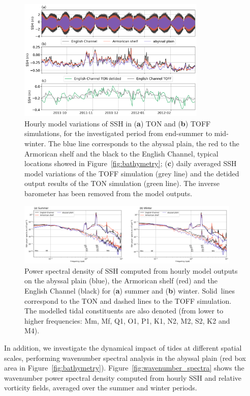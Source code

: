 \documentclass[jmse,article,accept,moreauthors,pdftex]{Definitions/mdpi}
\begin{document}
\begin{figure}[H]
    \centering
    \includegraphics[width=0.8\textwidth]{Definitions/figure10.png}
    \caption{Hourly model variations of SSH in (\textbf{a}) TON and (\textbf{b}) TOFF simulations, for the investigated period from end-summer to mid-winter. The blue line corresponds to the abyssal plain, the red to the Armorican shelf and the black to the English Channel, typical locations showed in Figure~\ref{fig:bathymetry}; (\textbf{c}) daily averaged SSH model variations of the TOFF simulation (grey line) and the detided output results of the TON simulation (green line). The inverse barometer has been removed from the model outputs.} 
    \label{fig:ssh_tseries}
\end{figure}
\unskip
\begin{figure}[H]
    \centering
    \includegraphics[width=0.95\textwidth]{Definitions/figure11.png}
    \caption{Power spectral density of SSH computed from hourly model outputs on the abyssal plain (blue), the Armorican shelf (red) and the English Channel (black) for (\textbf{a}) summer and (\textbf{b}) winter. Solid~lines correspond to the TON and dashed lines to the TOFF simulation. The modelled tidal constituents are also denoted (from lower to higher frequencies: Mm, Mf, Q1, O1, P1, K1, N2, M2, S2, K2 and M4).} 
    \label{fig:ssh_freq}
\end{figure}

In addition, we investigate the dynamical impact of tides at different spatial scales, performing wavenumber spectral analysis in the abyssal plain (red box area in Figure~\ref{fig:bathymetry}). Figure~\ref{fig:wavenumber_spectra} shows the wavenumber power spectral density computed from hourly SSH and relative vorticity fields, averaged over the summer and winter periods.
\end{document}
